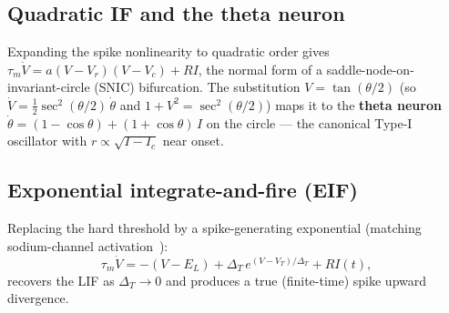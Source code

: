 \documentclass[11pt]{article}
\begin{document}
\subsection{Quadratic IF and the theta neuron}
Expanding the spike nonlinearity to quadratic order gives $\tau_m\dot V=a(V-V_r)(V-V_c)+RI$, the
normal form of a saddle-node-on-invariant-circle (SNIC) bifurcation. The substitution
$V=\tan(\theta/2)$ (so $\dot V=\tfrac12\sec^2(\theta/2)\,\dot\theta$ and $1+V^2=\sec^2(\theta/2)$)
maps it to the \textbf{theta neuron} $\dot\theta=(1-\cos\theta)+(1+\cos\theta)\,I$ on the circle ---
the canonical Type-I oscillator with $r\propto\sqrt{I-I_c}$ near onset.

\subsection{Exponential integrate-and-fire (EIF)}
Replacing the hard threshold by a spike-generating exponential (matching sodium-channel
activation~\cite{fourcaud2003}):
\begin{equation}
  \tau_m\dot V=-(V-E_L)+\Delta_T\,e^{(V-V_T)/\Delta_T}+RI(t),
  \label{eq:eif}
\end{equation}
recovers the LIF as $\Delta_T\to0$ and produces a true (finite-time) spike upward divergence.
\end{document}

